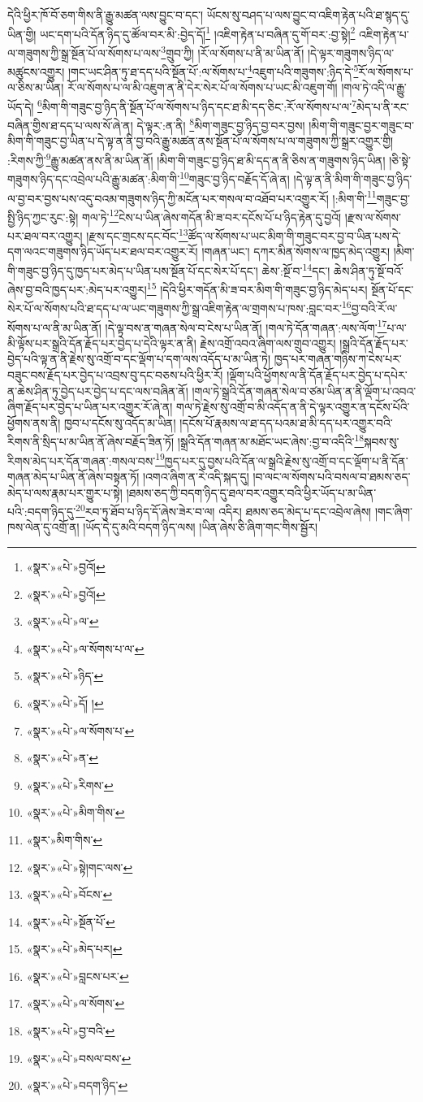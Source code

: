 དེའི་ཕྱིར་ཁོ་བོ་ཅག་གིས་ནི་རྒྱུ་མཚན་ལས་བྱུང་བ་དང་། ཡོངས་སུ་བཤད་པ་ལས་བྱུང་བ་འཇིག་རྟེན་པའི་ཐ་སྙད་དུ་ཡིན་གྱི། ཡང་དག་པའི་དོན་ཉིད་དུ་ཚོལ་བར་མི་:བྱེད་དོ།\footnote{«སྣར་»«པེ་»བྱའོ།} །འཇིག་རྟེན་པ་བཞིན་དུ་གོ་བར་:བྱ་སྟེ།\footnote{«སྣར་»«པེ་»བྱའོ།} འཇིག་རྟེན་པ་ལ་གཟུགས་ཀྱི་སྒྲ་སྔོན་པོ་ལ་སོགས་པ་ལས་\footnote{«སྣར་»«པེ་»ལ་}གྲུབ་ཀྱི། །རོ་ལ་སོགས་པ་ནི་མ་ཡིན་ནོ། །དེ་ལྟར་གཟུགས་ཉིད་ལ་མཚུངས་འགྱུར། །གང་ཡང་ཤིན་ཏུ་ཐ་དད་པའི་སྔོན་པོ་:ལ་སོགས་པ་\footnote{«སྣར་»«པེ་»ལ་སོགས་པ་ལ་}འཇུག་པའི་གཟུགས་:ཉིད་དེ་\footnote{«སྣར་»«པེ་»ཉིད་}རོ་ལ་སོགས་པ་ལ་ཅིས་མ་ཡིན། རོ་ལ་སོགས་པ་ལ་མི་འཇུག་ན་ནི་དེར་སེར་པོ་ལ་སོགས་པ་ཡང་མི་འཇུག་གོ། །གལ་ཏེ་འདི་ལ་རྒྱུ་ཡོད་དེ། \footnote{«སྣར་»«པེ་»དོ། ། }མིག་གི་གཟུང་བྱ་ཉིད་ནི་སྔོན་པོ་ལ་སོགས་པ་ཉིད་དང་ཐ་མི་དད་ཅིང་:རོ་ལ་སོགས་པ་ལ་\footnote{«སྣར་»«པེ་»ལ་སོགས་པ་}མེད་པ་ནི་རང་བཞིན་གྱིས་ཐ་དད་པ་ལས་སོ་ཞེ་ན། དེ་ལྟར་:ན་ནི། \footnote{«སྣར་»«པེ་»ན་}མིག་གཟུང་བྱ་ཉིད་བྱ་བར་བྱས། །མིག་གི་གཟུང་བྱར་གཟུང་བ་མིག་གི་གཟུང་བྱ་ཡིན་པ་དེ་ལྟ་ན་ནི་བྱ་བའི་རྒྱུ་མཚན་ནས་སྔོན་པོ་ལ་སོགས་པ་ལ་གཟུགས་ཀྱི་སྒྲར་འགྱུར་གྱི། :རིགས་ཀྱི་\footnote{«སྣར་»«པེ་»རིགས་}རྒྱུ་མཚན་ནས་ནི་མ་ཡིན་ནོ། །མིག་གི་གཟུང་བྱ་ཉིད་ཐ་མི་དད་ན་ནི་ཅིས་ན་གཟུགས་ཉིད་ཡིན། །ཅི་སྟེ་གཟུགས་ཉིད་དང་འབྲེལ་པའི་རྒྱུ་མཚན་:མིག་གི་\footnote{«སྣར་»«པེ་»མིག་གིས་}གཟུང་བྱ་ཉིད་བརྗོད་དོ་ཞེ་ན། །དེ་ལྟ་ན་ནི་མིག་གི་གཟུང་བྱ་ཉིད་ལ་བྱ་བར་བྱས་པས་འདུ་བའམ་གཟུགས་ཉིད་ཀྱི་མངོན་པར་གསལ་བ་འཐོབ་པར་འགྱུར་རོ། །:མིག་གི་\footnote{«སྣར་»མིག་གིས་}གཟུང་བྱ་སྤྱི་ཉིད་ཀྱང་རུང་:སྟེ། གལ་ཏེ་\footnote{«སྣར་»«པེ་»སྟེ།གང་ལས་}ངེས་པ་ཡིན་ཞེས་གདོན་མི་ཟ་བར་དངོས་པོ་པ་ཉིད་རྟེན་དུ་བྱའོ། །རྫས་ལ་སོགས་པར་ཐལ་བར་འགྱུར། །རྫས་དང་གྲངས་དང་བོང་\footnote{«སྣར་»«པེ་»བོངས་}ཚོད་ལ་སོགས་པ་ཡང་མིག་གི་གཟུང་བར་བྱ་བ་ཡིན་པས་དེ་དག་ལའང་གཟུགས་ཉིད་ཡོད་པར་ཐལ་བར་འགྱུར་རོ། །གཞན་ཡང་། དཀར་མིན་སོགས་ལ་ཁྱད་མེད་འགྱུར། །མིག་གི་གཟུང་བྱ་ཉིད་དུ་ཁྱད་པར་མེད་པ་ཡིན་པས་སྔོན་པོ་དང་སེར་པོ་དང་། ཆེས་:སྔོ་བ་\footnote{«སྣར་»«པེ་»སྔོན་པོ་}དང་། ཆེས་ཤིན་ཏུ་སྔོ་བའོ་ཞེས་བྱ་བའི་ཁྱད་པར་:མེད་པར་འགྱུར།\footnote{«སྣར་»«པེ་»མེད་པར།} །དེའི་ཕྱིར་གདོན་མི་ཟ་བར་མིག་གི་གཟུང་བྱ་ཉིད་མེད་པར། སྔོན་པོ་དང་སེར་པོ་ལ་སོགས་པའི་ཐ་དད་པ་ལ་ཡང་གཟུགས་ཀྱི་སྒྲ་འཇིག་རྟེན་ལ་གྲགས་པ་ཁས་:བླང་བར་\footnote{«སྣར་»«པེ་»བླངས་པར་}བྱ་བའི་རོ་ལ་སོགས་པ་ལ་ནི་མ་ཡིན་ནོ། །དེ་ལྟ་བས་ན་གཞན་སེལ་བ་ངེས་པ་ཡིན་ནོ། །གལ་ཏེ་དོན་གཞན་:ལས་ལོག་\footnote{«སྣར་»«པེ་»ལ་སོགས་}པ་ལ་མི་ལྟོས་པར་སྒྲའི་དོན་རྗོད་པར་བྱེད་པ་དེའི་ལྟར་ན་ནི། རྗེས་འགྲོ་འབའ་ཞིག་ལས་གྲུབ་འགྱུར། །སྒྲའི་དོན་རྗོད་པར་བྱེད་པའི་ལྟ་ན་ནི་རྗེས་སུ་འགྲོ་བ་དང་ལྡོག་པ་དག་ལས་འདོད་པ་མ་ཡིན་ཏེ། ཁྱད་པར་གཞན་གཉིས་ཀ་ངེས་པར་བཟུང་བས་རྗོད་པར་བྱེད་པ་འབྲས་བུ་དང་བཅས་པའི་ཕྱིར་རོ། །ལྡོག་པའི་ཕྱོགས་ལ་ནི་དོན་རྗོད་པར་བྱེད་པ་དཔེར་ན་ཆེས་ཤིན་ཏུ་བྱེད་པར་བྱེད་པ་དང་ལས་བཞིན་ནོ། །གལ་ཏེ་སྒྲའི་དོན་གཞན་སེལ་བ་ཙམ་ཡིན་ན་ནི་ལྡོག་པ་འབའ་ཞིག་རྗོད་པར་བྱེད་པ་ཡིན་པར་འགྱུར་རོ་ཞེ་ན། གལ་ཏེ་རྗེས་སུ་འགྲོ་བ་མི་འདོད་ན་ནི་དེ་ལྟར་འགྱུར་ན་དངོས་པོའི་ཕྱོགས་ནས་ནི། ཁྱབ་པ་དངོས་སུ་འདོད་མ་ཡིན། །དངོས་པོ་རྣམས་ལ་ཐ་དད་པའམ་ཐ་མི་དད་པར་འགྱུར་བའི་རིགས་ནི་སྲིད་པ་མ་ཡིན་ནོ་ཞེས་བརྗོད་ཟིན་ཏོ། །སྒྲའི་དོན་གཞན་མ་མཐོང་ཡང་ཞེས་:བྱ་བ་འདིའི་\footnote{«སྣར་»«པེ་»བྱ་བའི་}སྐབས་སུ་རིགས་མེད་པར་དོན་གཞན་:གསལ་བས་\footnote{«སྣར་»«པེ་»བསལ་བས་}ཁྱད་པར་དུ་བྱས་པའི་དོན་ལ་སྒྲའི་རྗེས་སུ་འགྲོ་བ་དང་ལྡོག་པ་ནི་དོན་གཞན་མེད་པ་ཡིན་ནོ་ཞེས་བསྟན་ཏོ། །འགའ་ཞིག་ན་རེ་འདི་སྐད་དུ། །བ་ལང་ལ་སོགས་པའི་བསལ་བ་ཐམས་ཅད་མེད་པ་ལས་རྣམ་པར་གྱུར་པ་སྟེ། །ཐམས་ཅད་ཀྱི་བདག་ཉིད་དུ་ཐལ་བར་འགྱུར་བའི་ཕྱིར་ཡོད་པ་མ་ཡིན་པའི་:བདག་ཉིད་དུ་\footnote{«སྣར་»«པེ་»བདག་ཉིད་}རབ་ཏུ་ཐོབ་པ་ཉིད་དོ་ཞེས་ཟེར་བ་ལ། འདིར། ཐམས་ཅད་མེད་པ་དང་འབྲེལ་ཞེས། །གང་ཞིག་ཁས་ལེན་དུ་འགྲོ་ན། །ཡོད་དེ་དུ་མའི་བདག་ཉིད་ལས། །ཡིན་ཞེས་ཅི་ཞིག་གང་གིས་སྦྱོར། 